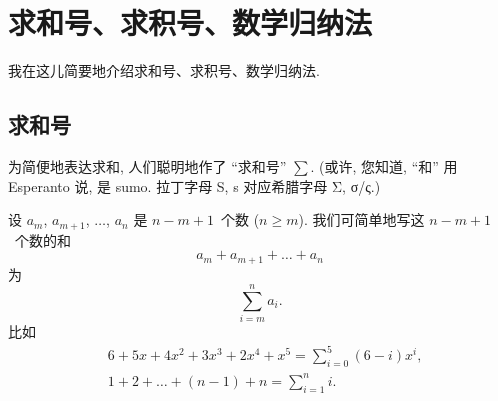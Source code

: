 \chapter{求和号、求积号、数学归纳法}

我在这儿简要地介绍求和号、求积号、数学归纳法.

\clearpage

\section{求和号}

为简便地表达求和,
人们聪明地作了 ``求和号'' \(\sum\).
(或许, 您知道, ``和'' 用 Esperanto 说, 是 sumo.
拉丁字母 S, s 对应希腊字母 Σ, σ/ς.)

设 \(a_m\), \(a_{m+1}\), \(\dots\), \(a_n\) 是
\(n - m + 1\)~个数 (\(n \geq m\)).
我们可简单地写这 \(n - m + 1\)~个数的和
\begin{equation}
    a_m + a_{m+1} + \dots + a_n
    \label{eq:B0101}
\end{equation}
为
\begin{equation}
    \sum_{i = m}^{n} {a_i}.
    \label{eq:B0102}
\end{equation}
比如
\begin{align*}
     & 6 + 5x + 4x^2 + 3x^3 + 2x^4 + x^5
    = \sum_{i = 0}^{5} {(6 - i)x^i},                       \\
     & 1 + 2 + \dots + (n - 1) + n = \sum_{i = 1}^{n} {i}.
\end{align*}

